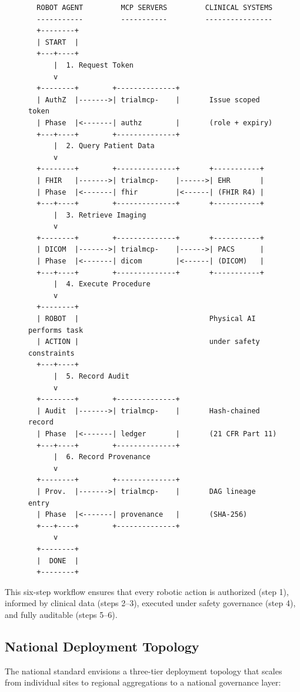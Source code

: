 \documentclass{article}
\begin{document}
\begin{figure}[H]
\begin{verbatim}
  ROBOT AGENT         MCP SERVERS         CLINICAL SYSTEMS
  -----------         -----------         ----------------
  +--------+
  | START  |
  +---+----+
      |  1. Request Token
      v
  +--------+        +--------------+
  | AuthZ  |------->| trialmcp-    |       Issue scoped token
  | Phase  |<-------| authz        |       (role + expiry)
  +---+----+        +--------------+
      |  2. Query Patient Data
      v
  +--------+        +--------------+       +-----------+
  | FHIR   |------->| trialmcp-    |------>| EHR       |
  | Phase  |<-------| fhir         |<------| (FHIR R4) |
  +---+----+        +--------------+       +-----------+
      |  3. Retrieve Imaging
      v
  +--------+        +--------------+       +-----------+
  | DICOM  |------->| trialmcp-    |------>| PACS      |
  | Phase  |<-------| dicom        |<------| (DICOM)   |
  +---+----+        +--------------+       +-----------+
      |  4. Execute Procedure
      v
  +--------+
  | ROBOT  |                               Physical AI performs task
  | ACTION |                               under safety constraints
  +---+----+
      |  5. Record Audit
      v
  +--------+        +--------------+
  | Audit  |------->| trialmcp-    |       Hash-chained record
  | Phase  |<-------| ledger       |       (21 CFR Part 11)
  +---+----+        +--------------+
      |  6. Record Provenance
      v
  +--------+        +--------------+
  | Prov.  |------->| trialmcp-    |       DAG lineage entry
  | Phase  |<-------| provenance   |       (SHA-256)
  +---+----+        +--------------+
      v
  +--------+
  |  DONE  |
  +--------+
\end{verbatim}
\end{figure}

This six-step workflow ensures that every robotic action is authorized (step 1), informed by clinical data (steps 2--3), executed under safety governance (step 4), and fully auditable (steps 5--6).

\subsection{National Deployment Topology}

The national standard envisions a three-tier deployment topology that scales from individual sites to regional aggregations to a national governance layer:
\end{document}
